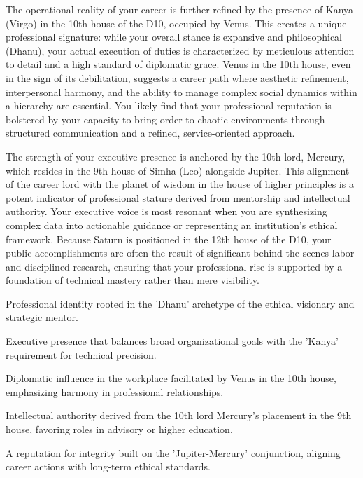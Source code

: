 {\fontsize{9}{13}\selectfont The operational reality of your career is further refined by the presence of Kanya (Virgo) in the 10th house of the D10, occupied by Venus. This creates a unique professional signature: while your overall stance is expansive and philosophical (Dhanu), your actual execution of duties is characterized by meticulous attention to detail and a high standard of diplomatic grace. Venus in the 10th house, even in the sign of its debilitation, suggests a career path where aesthetic refinement, interpersonal harmony, and the ability to manage complex social dynamics within a hierarchy are essential. You likely find that your professional reputation is bolstered by your capacity to bring order to chaotic environments through structured communication and a refined, service-oriented approach.}\par\vspace{1.8mm}

{\fontsize{9}{13}\selectfont The strength of your executive presence is anchored by the 10th lord, Mercury, which resides in the 9th house of Simha (Leo) alongside Jupiter. This alignment of the career lord with the planet of wisdom in the house of higher principles is a potent indicator of professional stature derived from mentorship and intellectual authority. Your executive voice is most resonant when you are synthesizing complex data into actionable guidance or representing an institution's ethical framework. Because Saturn is positioned in the 12th house of the D10, your public accomplishments are often the result of significant behind-the-scenes labor and disciplined research, ensuring that your professional rise is supported by a foundation of technical mastery rather than mere visibility.}\par\vspace{1.8mm}

\begin{diamondlist}
  \item {\fontsize{8.5}{12}\selectfont Professional identity rooted in the 'Dhanu' archetype of the ethical visionary and strategic mentor.}
  \item {\fontsize{8.5}{12}\selectfont Executive presence that balances broad organizational goals with the 'Kanya' requirement for technical precision.}
  \item {\fontsize{8.5}{12}\selectfont Diplomatic influence in the workplace facilitated by Venus in the 10th house, emphasizing harmony in professional relationships.}
  \item {\fontsize{8.5}{12}\selectfont Intellectual authority derived from the 10th lord Mercury's placement in the 9th house, favoring roles in advisory or higher education.}
  \item {\fontsize{8.5}{12}\selectfont A reputation for integrity built on the 'Jupiter-Mercury' conjunction, aligning career actions with long-term ethical standards.}
\end{diamondlist}

